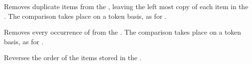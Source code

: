 \documentclass[oneside]{book}
\begin{document}
\begin{function}{\seqVarRemoveDuplicates}
\begin{syntax}
 
\end{syntax}
Removes duplicate items from the , leaving the
left most copy of each item in the .  The 
comparison takes place on a token basis, as for .
\begin{demohigh}
\seqSetFromClist {}
\seqVarRemoveDuplicates \lTmpaSeq
\seqVarJoin \lTmpaSeq {,}
\end{demohigh}
\end{function}

\begin{function}{\seqVarRemoveAll}
\begin{syntax}
  
\end{syntax}
Removes every occurrence of  from the .
The  comparison takes place on a token basis, as for .
\begin{demohigh}
\seqSetFromClist {}
\seqVarRemoveAll {}
\seqVarJoin \lTmpaSeq {,}
\end{demohigh}
\end{function}

\begin{function}{\seqVarReverse}
\begin{syntax}
 
\end{syntax}
Reverses the order of the items stored in the .
\begin{demohigh}
\seqSetFromClist {}
\seqVarReverse \lTmpaSeq
\seqVarJoin \lTmpaSeq {,}
\end{demohigh}
\end{function}

\end{document}
